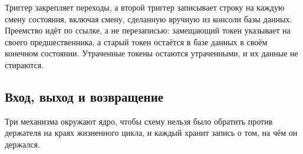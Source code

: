 Триггер закрепляет переходы, а второй триггер записывает строку  на каждую смену состояния, включая
смену, сделанную вручную из консоли базы данных. Преемство идёт по ссылке, а не перезаписью:
замещающий токен указывает на своего предшественника, а старый токен остаётся в базе данных в
своём конечном состоянии. Утраченные токены остаются утраченными, и их данные не стираются.
\sImpl

\subsection{Вход, выход и возвращение}

Три механизма окружают ядро, чтобы схему нельзя было обратить против держателя на краях
жизненного цикла, и каждый хранит запись о том, на чём он держался.


